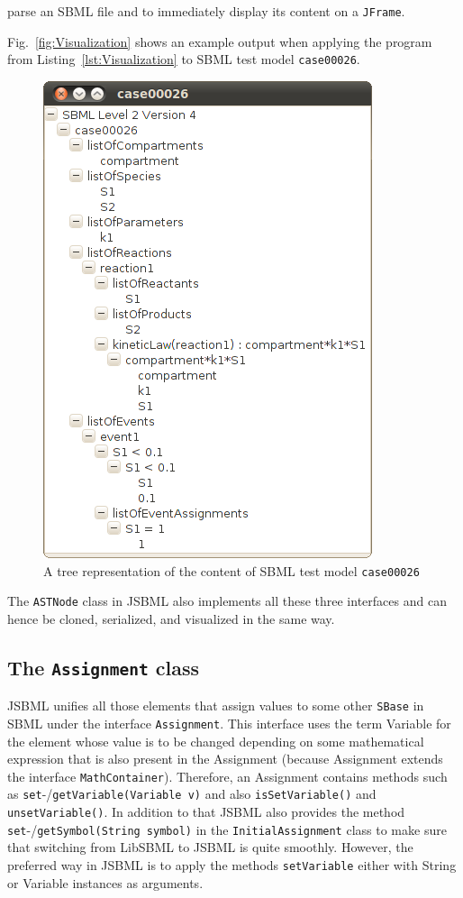 \documentclass[
  BCOR12mm,
  letterpaper,
  11pt,
  headsepline,
  pointlessnumbers,
  tablecaptionabove,
  headinclude,
  appendixprefix,
  idxtotoc,
  bibtotoc,
  twoside,
  titlepage
]{scrartcl}
\begin{document}
parse an SBML file and to immediately display its content on a \verb!JFrame!.

Fig.~\vref{fig:Visualization} shows an example output when applying the program
from Listing~\vref{lst:Visualization} to SBML test model \texttt{case00026}.
\begin{figure}
\includegraphics[width=.35\textwidth]{posters/2010_ICSB_and_COMBINE/JSBMLvisualizerTransparent}
\caption[Tree representation of an SBML file]{A tree representation of the
content of SBML test model \texttt{case00026}}
\label{fig:Visualization}
\end{figure}
The \verb!ASTNode! class in JSBML also implements all these three interfaces and
can hence be cloned, serialized, and visualized in the same way.


\subsection{The \texttt{Assignment} class}

JSBML unifies all those elements that assign values to some other
\verb!SBase! in SBML under the interface \texttt{Assignment}. This interface
uses the term Variable for the element whose value is to be changed depending
on some mathematical expression that is also present in the Assignment
(because Assignment extends the interface \texttt{MathContainer}). Therefore,
an Assignment contains methods such as
\verb!set!-/\verb!getVariable(Variable v)! and also \verb!isSetVariable()! and
\verb!unsetVariable()!. In addition to that JSBML also provides the method \verb!set!-/\verb!getSymbol(String symbol)! in the \texttt{InitialAssignment}
class to make sure that switching from LibSBML to JSBML is quite smoothly.
However, the preferred way in JSBML is to apply the methods
\texttt{setVariable} either with String or Variable instances as arguments.
\end{document}
